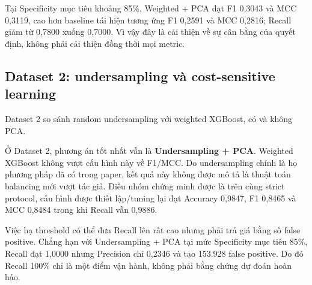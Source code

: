 Tại Specificity mục tiêu khoảng 85\%, Weighted + PCA đạt F1 0,3043 và MCC 0,3119, cao hơn baseline tái hiện tương ứng F1 0,2591 và MCC 0,2816; Recall giảm từ 0,7800 xuống 0,7000. Vì vậy đây là cải thiện về sự cân bằng của quyết định, không phải cải thiện đồng thời mọi metric.

\subsection{Dataset 2: undersampling và cost-sensitive learning}

Dataset 2 so sánh random undersampling với weighted XGBoost, có và không PCA.

\begin{table}[H]
\centering
\scriptsize
\caption{Dataset 2: các phương pháp xử lý mất cân bằng tại ngưỡng 0,5}
\label{tab:d2_methods_default}
\end{table}

Ở Dataset 2, phương án tốt nhất vẫn là \textbf{Undersampling + PCA}. Weighted XGBoost không vượt cấu hình này về F1/MCC. Do undersampling chính là họ phương pháp đã có trong paper, kết quả này không được mô tả là thuật toán balancing mới vượt tác giả. Điều nhóm chứng minh được là trên cùng strict protocol, cấu hình được thiết lập/tuning lại đạt Accuracy 0,9847, F1 0,8465 và MCC 0,8484 trong khi Recall vẫn 0,9886.

Việc hạ threshold có thể đưa Recall lên rất cao nhưng phải trả giá bằng số false positive. Chẳng hạn với Undersampling + PCA tại mức Specificity mục tiêu 85\%, Recall đạt 1,0000 nhưng Precision chỉ 0,2346 và tạo 153.928 false positive. Do đó Recall 100\% chỉ là một điểm vận hành, không phải bằng chứng dự đoán hoàn hảo.

